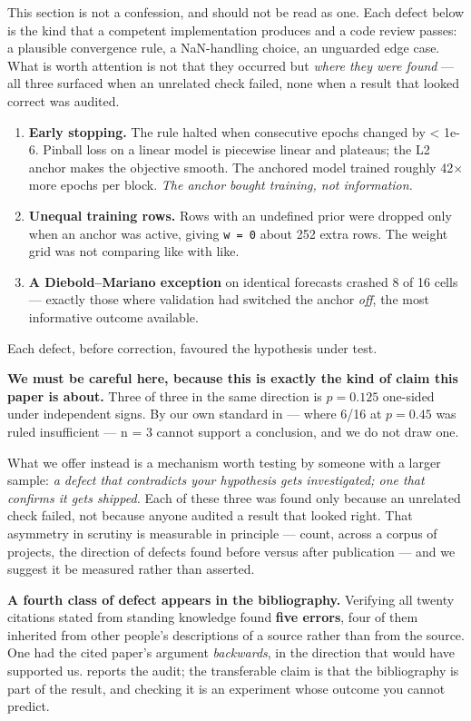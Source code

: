 This section is not a confession, and should not be read as one. Each defect below is the kind
that a competent implementation produces and a code review passes: a plausible convergence rule,
a NaN-handling choice, an unguarded edge case. What is worth attention is not that they occurred
but \emph{where they were found} --- all three surfaced when an unrelated check failed, none when a
result that looked correct was audited.

\begin{enumerate}
\def\labelenumi{\arabic{enumi}.}
\tightlist
\item
  \textbf{Early stopping.} The rule halted when consecutive epochs changed by \textless{} 1e-6. Pinball loss
  on a linear model is piecewise linear and plateaus; the L2 anchor makes the objective smooth.
  The anchored model trained roughly 42$\times$ more epochs per block. \emph{The anchor bought training,
  not information.}
\item
  \textbf{Unequal training rows.} Rows with an undefined prior were dropped only when an anchor was
  active, giving \texttt{w\ =\ 0} about 252 extra rows. The weight grid was not comparing like with like.
\item
  \textbf{A Diebold--Mariano exception} on identical forecasts crashed 8 of 16 cells --- exactly those
  where validation had switched the anchor \emph{off}, the most informative outcome available.
\end{enumerate}

Each defect, before correction, favoured the hypothesis under test.

\textbf{We must be careful here, because this is exactly the kind of claim this paper is about.}
Three of three in the same direction is \textbf{\(p = 0.125\)} one-sided under independent signs. By our
own standard in  --- where 6/16 at \(p = 0.45\) was ruled insufficient --- n = 3 cannot support a
conclusion, and we do not draw one.

What we offer instead is a mechanism worth testing by someone with a larger sample: \emph{a defect
that contradicts your hypothesis gets investigated; one that confirms it gets shipped.} Each of
these three was found only because an unrelated check failed, not because anyone audited a
result that looked right. That asymmetry in scrutiny is measurable in principle --- count, across
a corpus of projects, the direction of defects found before versus after publication --- and we
suggest it be measured rather than asserted.

\textbf{A fourth class of defect appears in the bibliography.} Verifying all twenty citations stated
from standing knowledge found \textbf{five errors}, four of them inherited from other people's
descriptions of a source rather than from the source. One had the cited paper's argument
\emph{backwards}, in the direction that would have supported us. \textbf{} reports the audit;
the transferable claim is that the bibliography is part of the result, and checking it is an
experiment whose outcome you cannot predict.
